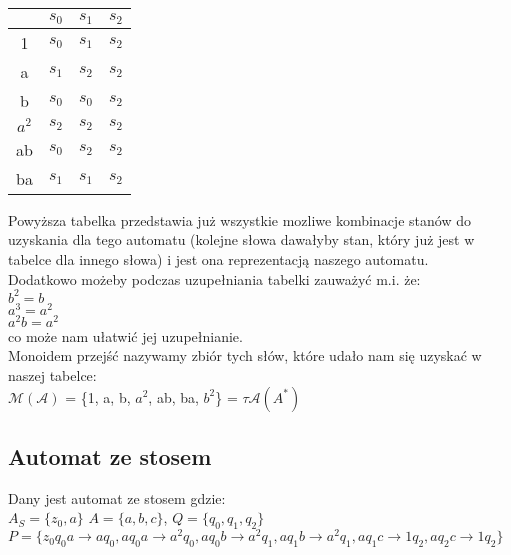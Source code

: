 \documentclass[main.tex]{subfiles}
\begin{document}
    \begin{table}[H]
        \centering
        \begin{tabular}{|c|l|l|l|}
            \hline
            & $s_{0}$ & $s_{1}$ & $s_{2}$ \\ \hline
            1 & $s_{0}$ & $s_{1}$ & $s_{2}$ \\ \hline
            a & $s_{1}$ & $s_{2}$ & $s_{2}$ \\ \hline
            b & $s_{0}$ & $s_{0}$ & $s_{2}$ \\ \hline
            $a^2$  & $s_{2}$ & $s_{2}$ & $s_{2}$ \\ \hline
            ab & $s_{0}$ & $s_{2}$ & $s_{2}$ \\ \hline
            ba & $s_{1}$ & $s_{1}$ & $s_{2}$ \\ \hline
        \end{tabular}
    \end{table}

    \noindent Powyższa tabelka przedstawia już wszystkie mozliwe kombinacje stanów do uzyskania dla tego automatu (kolejne słowa dawałyby stan, który już jest w tabelce dla innego słowa) i jest ona reprezentacją naszego automatu. \\

    \noindent Dodatkowo możeby podczas uzupełniania tabelki zauważyć m.i. że: \\
    $b^2 = b$ \\
    $a^3 = a^2$ \\
    $a^{2}b = a^2$ \\
    co może nam ułatwić jej uzupełnianie. \\

    \noindent Monoidem przejść nazywamy zbiór tych słów, które udało nam się uzyskać w naszej tabelce: \\
    $\mathcal{M(A)}$ = \{1, a, b, $a^2$, ab, ba, $b^2$\} = $\tau \mathcal{A}(A^{*})$

    \subsection{Automat ze stosem}
    Dany jest automat ze stosem gdzie: \\
    $A_{S} = \{z_{0}, a\}$ $A = \{a, b, c\}$, $Q = \{q_{0}, q_{1}, q_{2}\}$ \\
    $P = \{z_{0}q_{0}a \rightarrow aq_{0}, aq_{0}a \rightarrow a^2q_{0}, aq_{0}b \rightarrow a^2q_{1}, aq_{1}b \rightarrow a^2q_{1}, aq_{1}c \rightarrow 1q_{2}, aq_{2}c \rightarrow 1q_{2}\}$ \\
\end{document}
